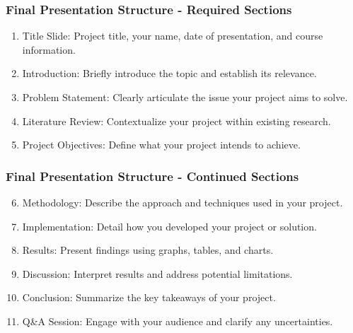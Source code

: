 \documentclass[aspectratio=169]{beamer}
\begin{document}
\begin{frame}[fragile]
    \frametitle{Final Presentation Structure - Required Sections}
    \begin{enumerate}
        \item Title Slide: Project title, your name, date of presentation, and course information.
        \item Introduction: Briefly introduce the topic and establish its relevance.
        \item Problem Statement: Clearly articulate the issue your project aims to solve.
        \item Literature Review: Contextualize your project within existing research.
        \item Project Objectives: Define what your project intends to achieve.
    \end{enumerate}
\end{frame}

\begin{frame}[fragile]
    \frametitle{Final Presentation Structure - Continued Sections}
    \begin{enumerate}
        \setcounter{enumi}{5} %
        \item Methodology: Describe the approach and techniques used in your project.
        \item Implementation: Detail how you developed your project or solution.
        \item Results: Present findings using graphs, tables, and charts.
        \item Discussion: Interpret results and address potential limitations.
        \item Conclusion: Summarize the key takeaways of your project.
        \item Q\&A Session: Engage with your audience and clarify any uncertainties.
    \end{enumerate}
\end{frame}
\end{document}
